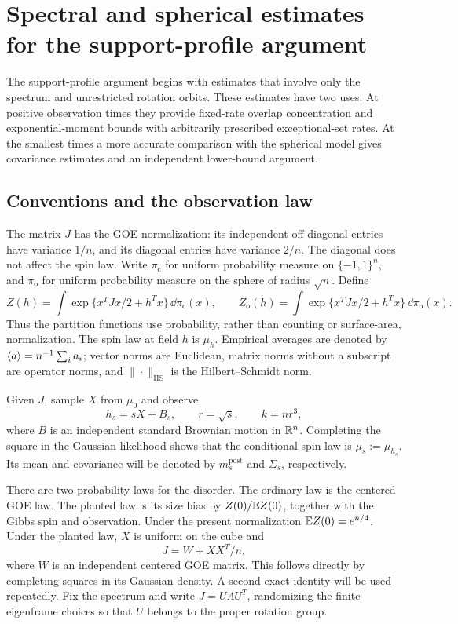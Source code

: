 \section{Spectral and spherical estimates for the support-profile argument}
\label{prof:sec:spectral}

The support-profile argument begins with estimates that involve only the
spectrum and unrestricted rotation orbits.  These estimates have two uses.
At positive observation times they provide fixed-rate overlap concentration
and exponential-moment bounds with arbitrarily prescribed exceptional-set
rates. At the
smallest times a more accurate comparison with the spherical model gives
covariance estimates and an independent lower-bound argument.

\subsection{Conventions and the observation law}
\label{prof:subsec:conventions}

The matrix $J$ has the GOE normalization: its independent off-diagonal
entries have variance $1/n$, and its diagonal entries have variance $2/n$.
The diagonal does not affect the spin law.  Write $\pi_{\mathrm c}$ for
uniform probability measure on $\{-1,1\}^n$, and $\pi_{\mathrm o}$ for
uniform probability measure on the sphere of radius $\sqrt n$.  Define
\[
 Z(h)=\int \exp\{x^TJx/2+h^Tx\}\,\dd\pi_{\mathrm c}(x),
 \qquad
 Z_{\mathrm o}(h)=\int \exp\{x^TJx/2+h^Tx\}\,\dd\pi_{\mathrm o}(x).
\]
Thus the partition functions use probability, rather than counting or
surface-area, normalization.  The spin law at field $h$ is $\mu_h$.
Empirical averages are denoted by $\left\langle a\right\rangle=n^{-1}\sum_i a_i$; vector norms
are Euclidean, matrix norms without a subscript are operator norms, and
$\|\cdot\|_{\mathrm{HS}}$ is the Hilbert--Schmidt norm.

Given $J$, sample $X$ from $\mu_0$ and observe
\[
 h_s=sX+B_s,\qquad r=\sqrt s,\qquad k=nr^3,
\]
where $B$ is an independent standard Brownian motion in $\mathbb R^n$.
Completing the square in the Gaussian likelihood shows that the
conditional spin law is $\mu_s:=\mu_{h_s}$.  Its mean and covariance will
be denoted by $m_s^{\mathrm{post}}$ and $\Sigma_s$, respectively.

There are two probability laws for the disorder.  The ordinary law is
the centered GOE law.  The planted law is its size bias by
$Z(0)/\mathbb E Z(0)$, together with the Gibbs spin and observation.  Under the
present normalization $\mathbb E Z(0)=e^{n/4}$.  Under the
planted law, $X$ is uniform on the cube and
\[
 J=W+XX^T/n,
\]
where $W$ is an independent centered GOE matrix.  This follows directly
by completing squares in its Gaussian density.  A second exact identity
will be used repeatedly.  Fix the spectrum and write $J=U\Lambda U^T$,
randomizing the finite eigenframe choices so that $U$ belongs to the
proper rotation group.

